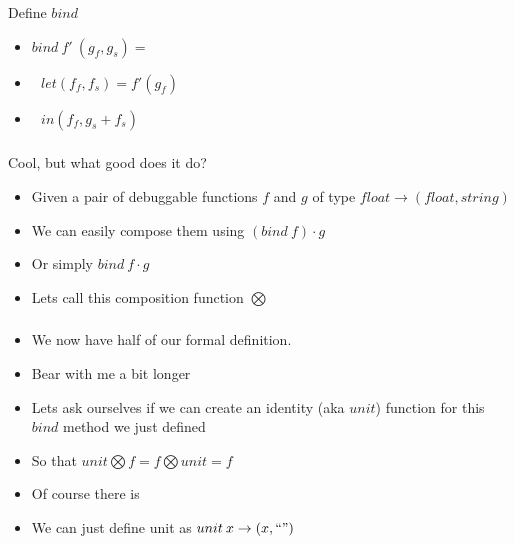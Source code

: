 \begin{frame}[fragile]
    \frametitle{}
    \begin{block}{Define $bind$}
        \begin{itemize}
            \item $bind \: f' \: (g_f, g_s) = $
            \item $\:\:\: let (f_f, f_s) = f'(g_f)$
            \item $\:\:\: in (f_f, g_s + f_s)$
        \end{itemize}
    \end{block}
\end{frame}

\begin{frame}[fragile]
    \frametitle{}
    \begin{block}{Cool, but what good does it do?}
        \begin{itemize}
            \item Given a pair of debuggable functions $f$ and $g$ of type $float \rightarrow (float, string)$
            \item We can easily compose them using $(bind \: f) \cdot g$
            \item Or simply $bind \: f \cdot g$
            \item Lets call this composition function $\bigotimes$
        \end{itemize}
    \end{block}
\end{frame}

\begin{frame}[fragile]
    \frametitle{}
    \begin{block}{}
        \begin{itemize}
            \item We now have half of our formal definition.
            \item Bear with me a bit longer
        \end{itemize}
    \end{block}
    \begin{block}{}
        \begin{itemize}
            \item Lets ask ourselves if we can create an identity (aka $unit$) function for this $bind$ method we just defined
            \item So that $unit \bigotimes f = f \bigotimes unit = f$
            \item Of course there is
            \item We can just define unit as $unit \: x \rightarrow (x, ``")$
        \end{itemize}
    \end{block}
\end{frame}

